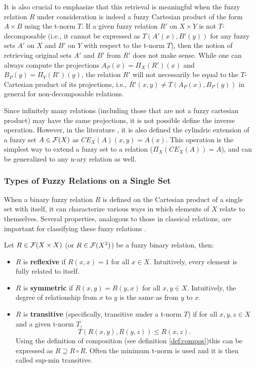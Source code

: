   \begin{remark}
  It is also crucial to emphasize that this retrieval is meaningful when the fuzzy relation $R$ under consideration is indeed a fuzzy Cartesian product of the form $A \times B$ using the t-norm $T$. If a given fuzzy relation $R'$ on $X \times Y$ is not $T$-decomposable (i.e., it cannot be expressed as $T(A'(x), B'(y))$ for any fuzzy sets $A'$ on $X$ and $B'$ on $Y$ with respect to the t-norm $T$), then the notion of retrieving original sets $A'$ and $B'$ from $R'$ does not make sense. While one can always compute the projections $A_P(x) = \Pi_X(R')(x)$ and $B_P(y) = \Pi_Y(R')(y)$, the relation $R'$ will not necessarily be equal to the $T$-Cartesian product of its projections, i.e., $R'(x,y) \neq T(A_P(x), B_P(y))$ in general for non-decomposable relations.
  \end{remark}


  Since infinitely many relations (including those that are not a fuzzy cartesian product) may have the same projections, it is not possible define the inverse operation. However, in the literature \cite[p.~61]{HistoryFL2017}, it is also defined the cylindric extension of a fuzzy set $A\in\mathcal{F}(X)$ as $CE_X(A)(x,y) = A(x)$. This operation is the simplest way to extend a fuzzy set to a relation ($\Pi_X(CE_X(A))=A$), and can be generalized to any n-ary relation as well.\\



\subsubsection*{Types of Fuzzy Relations on a Single Set}

When a binary fuzzy relation $R$ is defined on the Cartesian product of a single set with itself, it can characterize various ways in which elements of $X$ relate to themselves. Several properties, analogous to those in classical relations, are important for classifying these fuzzy relations \cite[p.~66]{HistoryFL2017}.

\begin{definition} Let $R \in \mathcal{F}(X \times X)$ (or $R \in \mathcal{F}(X^2)$) be a fuzzy binary relation, then:
  \begin{itemize}
    \item $R$ is \textbf{reflexive} if $R(x,x) = 1$ for all $x \in X$.
          Intuitively, every element is fully related to itself.
    \item $R$ is \textbf{symmetric} if $R(x,y) = R(y,x)$ for all $x,y \in X$.
          Intuitively, the degree of relationship from $x$ to $y$ is the same as from $y$ to $x$.
    \item $R$ is \textbf{transitive} (specifically, transitive under a t-norm $T$) if for all $x,y,z \in X$ and a given t-norm $T$,
          \[ T(R(x,y), R(y,z)) \le R(x,z). \]
          Using the definition of composition (see definition \ref{def:compos})this can be expressed as $R \supseteq R \circ R$. Often the minimum t-norm is used and it is then called sup-min transitive.
  \end{itemize}
\end{definition}

